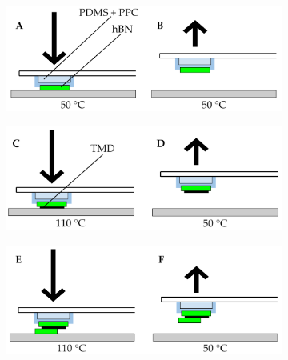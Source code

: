 \begin{figure}[t]
\centering
\begin{subfigure}{0.49\textwidth}
 	\includegraphics[width=\textwidth]{stamp_ab}

\end{subfigure}
\begin{subfigure}{0.49\textwidth}
	\includegraphics[width=\textwidth]{stamp_cd}
\end{subfigure}
\begin{subfigure}{0.49\textwidth}
 	\includegraphics[width=\textwidth]{stamp_ef}


\end{subfigure}
\end{figure}
